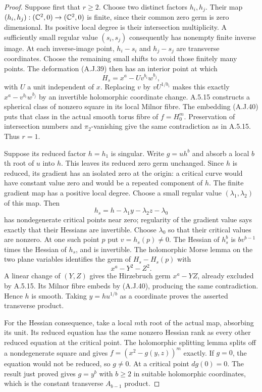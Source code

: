 \begin{proof}
Suppose first that $r\ge2$. Choose two distinct
factors $h_i,h_j$. Their map
$(h_i,h_j):(\mathbb C^2,0)\to(\mathbb C^2,0)$ is finite,
since their common zero germ is zero dimensional.
Its positive local degree is their intersection
multiplicity. A sufficiently small regular value
$(s_i,s_j)$ consequently has nonempty finite
inverse image. At each inverse-image point,
$h_i-s_i$ and $h_j-s_j$ are transverse coordinates.
Choose the remaining small shifts to avoid those
finitely many points. The deformation (A.J.39)
then has an interior point at which
\[
            H_s=x^a-U v^{b_i}w^{b_j},
\]
with $U$ a unit independent of $x$. Replacing
$v$ by $vU^{1/b_i}$ makes this exactly
$x^a-v^{b_i}w^{b_j}$ by an invertible holomorphic
coordinate change. A.5.15 constructs a spherical
class of nonzero square in its local Milnor fibre.
The embedding (A.J.40) puts that class in the
actual smooth torus fibre of $f=H_0^m$.
Preservation of intersection
numbers and $\pi_2$-vanishing give the same
contradiction as in A.5.15. Thus $r=1$.

Suppose its reduced factor $h=h_1$ is singular.
Write $g=u h^b$ and absorb a local $b$th root of
$u$ into $h$. This leaves its reduced zero germ
unchanged. Since $h$ is reduced, its gradient
has an isolated zero at the origin: a critical
curve would have constant value zero and would
be a repeated component of $h$. The finite
gradient map has a positive local degree.
Choose a small regular value
$(\lambda_1,\lambda_2)$ of this map. Then
\[
        h_s=h-\lambda_1y-\lambda_2z-\lambda_0
\]
has nondegenerate critical points near zero;
regularity of the gradient value says exactly
that their Hessians are invertible. Choose
$\lambda_0$ so that their critical values are
nonzero. At one such point $p$ put
$v=h_s(p)\ne0$. The Hessian of $h_s^b$ is
$b v^{b-1}$ times the Hessian of $h_s$, and
is invertible. The holomorphic Morse lemma on
the two plane variables identifies the germ of
$H_s-H_s(p)$ with
\[
                         x^a-Y^2-Z^2.
\]
A linear change of $(Y,Z)$ gives the Hirzebruch
germ $x^a-YZ$, already excluded by A.5.15.
Its Milnor fibre embeds by (A.J.40), producing
the same contradiction. Hence $h$ is smooth.
Taking $y=h u^{1/b}$ as a coordinate proves the
asserted transverse product.

For the Hessian consequence, take a local $m$th
root of the actual map, absorbing its unit.
Its reduced equation has the same nonzero
Hessian rank as every other reduced equation
at the critical point. The holomorphic splitting
lemma splits off a nondegenerate square and
gives $f=(x^2-g(y,z))^m$ exactly. If $g=0$,
the equation would not be reduced, so $g\ne0$.
At a critical point $dg(0)=0$. The result just
proved gives $g=y^b$ with $b\ge2$ in suitable
holomorphic coordinates, which is the constant
transverse $A_{b-1}$ product.
\end{proof}


